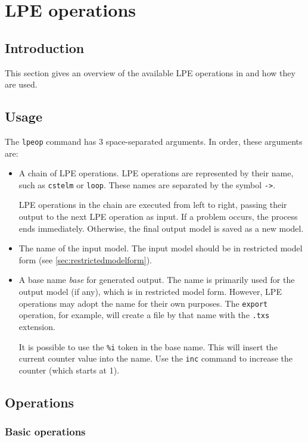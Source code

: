 \chapter{LPE operations}

\section{Introduction}

This section gives an overview of the available LPE operations in \txs{} and how they are used.

\section{Usage}

The \texttt{lpeop} command has 3 space-separated arguments. In order, these arguments are:

\begin{itemize}
\item A chain of LPE operations.
LPE operations are represented by their name, such as \texttt{cstelm} or \texttt{loop}.
These names are separated by the symbol \texttt{->}.

LPE operations in the chain are executed from left to right, passing their output to the next LPE operation as input.
If a problem occurs, the process ends immediately.
Otherwise, the final output model is saved as a new model.
\item The name of the input model.
The input model should be in restricted model form (see \ref{sec:restrictedmodelform}).
\item A base name \textit{base} for generated output.
The name is primarily used for the output model (if any), which is in restricted model form.
However, LPE operations may adopt the name for their own purposes.
The \texttt{export} operation, for example, will create a file by that name with the \texttt{.txs} extension.

It is possible to use the \texttt{\%i} token in the base name.
This will insert the current counter value into the name.
Use the \texttt{inc} command to increase the counter (which starts at 1).
\end{itemize}

\section{Operations}

\subsection{Basic operations}

